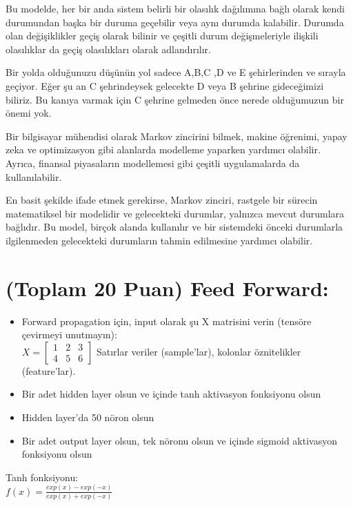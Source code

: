 \documentclass[11pt]{article}
\begin{document}
Bu modelde, her bir anda sistem belirli bir olasılık dağılımına bağlı olarak kendi durumundan başka bir duruma geçebilir veya aynı durumda kalabilir. Durumda olan değişiklikler geçiş olarak bilinir ve çeşitli durum değişmeleriyle ilişkili olasılıklar da geçiş olasılıkları olarak adlandırılır.

Bir yolda olduğunuzu düşünün yol sadece A,B,C ,D ve E şehirlerinden ve sırayla geçiyor. Eğer şu an C şehrindeysek gelecekte D veya B şehrine gideceğimizi biliriz. Bu kanıya varmak için C şehrine gelmeden önce nerede olduğumuzun bir önemi yok.

Bir bilgisayar mühendisi olarak Markov zincirini bilmek, makine öğrenimi, yapay zeka ve optimizasyon gibi alanlarda modelleme yaparken yardımcı olabilir. Ayrıca, finansal piyasaların modellemesi gibi çeşitli uygulamalarda da kullanılabilir.

En basit şekilde ifade etmek gerekirse, Markov zinciri, rastgele bir sürecin matematiksel bir modelidir ve gelecekteki durumlar, yalnızca mevcut durumlara bağlıdır. Bu model, birçok alanda kullanılır ve bir sistemdeki önceki durumlarla ilgilenmeden gelecekteki durumların tahmin edilmesine yardımcı olabilir.


\section{(Toplam 20 Puan) Feed Forward:}
 
\begin{itemize}
    \item Forward propagation için, input olarak şu X matrisini verin (tensöre çevirmeyi unutmayın):\\
    $X = \begin{bmatrix}
        1 & 2 & 3\\
        4 & 5 & 6
        \end{bmatrix}$
    Satırlar veriler (sample'lar), kolonlar öznitelikler (feature'lar).
    \item Bir adet hidden layer olsun ve içinde tanh aktivasyon fonksiyonu olsun
    \item Hidden layer'da 50 nöron olsun
    \item Bir adet output layer olsun, tek nöronu olsun ve içinde sigmoid aktivasyon fonksiyonu olsun
\end{itemize}

Tanh fonksiyonu:\\
$f(x) = \frac{exp(x) - exp(-x)}{exp(x) + exp(-x)}$
\vspace{.2in}
\end{document}
